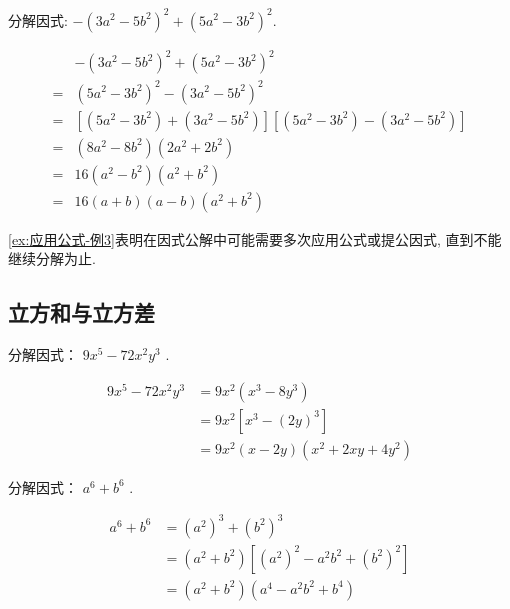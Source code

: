 \begin{example}\label{ex:应用公式-例3}
	分解因式: $-\left(3 a^{2}-5 b^{2}\right)^{2}+\left(5 a^{2}-3 b^{2}\right)^{2}$.
\end{example}
\begin{solution}
	\begin{align*}
		  & -\left(3 a^{2}-5 b^{2}\right)^{2}+\left(5 a^{2}-3 b^{2}\right)^{2}                                                                           \\
		= & \left(5 a^{2}-3 b^{2}\right)^{2}-\left(3 a^{2}-5 b^{2}\right)^{2}                                                                            \\
		= & \left[\left(5 a^{2}-3 b^{2}\right)+\left(3 a^{2}-5 b^{2}\right)\right]\left[\left(5 a^{2}-3 b^{2}\right)-\left(3 a^{2}-5 b^{2}\right)\right] \\
		= & \left(8 a^{2}-8 b^{2}\right)\left(2 a^{2}+2 b^{2}\right)                                                                                     \\
		= & 16\left(a^{2}-b^{2}\right)\left(a^{2}+b^{2}\right)                                                                                           \\
		= & 16(a+b)(a-b)\left(a^{2}+b^{2}\right)
	\end{align*}
\end{solution}
\begin{note}
	\autoref{ex:应用公式-例3}表明在因式公解中可能需要多次应用公式或提公因式, 直到不能继续分解为止.
\end{note}

\subsection{立方和与立方差}
\begin{example}
	分解因式： $9 x^{5}-72 x^{2} y^{3}$ .
\end{example}
\begin{solution}
	\begin{align*}
		9 x^{5}-72 x^{2} y^{3} & = 9 x^{2}\left(x^{3}-8 y^{3}\right)              \\
		                       & = 9 x^{2}\left[x^{3}-(2 y)^{3}\right]            \\
		                       & = 9 x^{2}(x-2 y)\left(x^{2}+2 x y+4 y^{2}\right)
	\end{align*}
\end{solution}

\begin{example}
	分解因式： $a^{6}+b^{6}$ .
\end{example}
\begin{solution}
	\begin{align*}
		a^{6}+b^{6} & = \left(a^{2}\right)^{3}+\left(b^{2}\right)^{3}                                                  \\
		            & = \left(a^{2}+b^{2}\right)\left[\left(a^{2}\right)^{2}-a^{2} b^{2}+\left(b^{2}\right)^{2}\right] \\
		            & = \left(a^{2}+b^{2}\right)\left(a^{4}-a^{2} b^{2}+b^{4}\right)
	\end{align*}
\end{solution}
